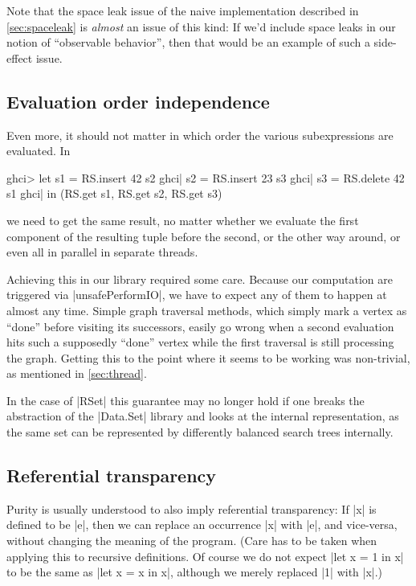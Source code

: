 \documentclass[manuscript,screen,acmsmall,nonacm]{acmart}
\begin{document}
Note that the space leak issue of the naive implementation described in \cref{sec:spaceleak} is \emph{almost} an issue of this kind: If we’d include space leaks in our notion of “observable behavior”, then that would be an example of such a side-effect issue.

\subsection{Evaluation order independence}

Even more, it should not matter in which order the various subexpressions are evaluated. In
\begin{code}
ghci>  let  s1 = RS.insert 42 s2
ghci|       s2 = RS.insert 23 s3
ghci|       s3 = RS.delete 42 s1
ghci|  in (RS.get s1, RS.get s2, RS.get s3)
\end{code}
we need to get the same result, no matter whether we evaluate the first component of the resulting tuple before the second, or the other way around, or even all in parallel in separate threads.

Achieving this in our library required some care. Because our computation are triggered via |unsafePerformIO|, we have to expect any of them to happen at almost any time. Simple graph traversal methods, which simply mark a vertex as “done” before visiting its successors, easily go wrong when a second evaluation hits such a supposedly “done” vertex while the first traversal is still processing the graph. Getting this to the point where it seems to be working was non-trivial, as mentioned in \cref{sec:thread}.

In the case of |RSet| this guarantee may no longer hold if one breaks the abstraction of the |Data.Set| library and looks at the internal representation, as the same set can be represented by differently balanced search trees internally.

\subsection{Referential transparency}\label{sec:reftrans}

Purity is usually understood to also imply referential transparency: If |x| is defined to be |e|, then we can replace an occurrence |x| with |e|, and vice-versa, without changing the meaning of the program.
(Care has to be taken when applying this to recursive definitions. Of course we do not expect |let x = 1 in x| to be the same as |let x = x in x|, although we merely replaced |1| with |x|.)
\end{document}
